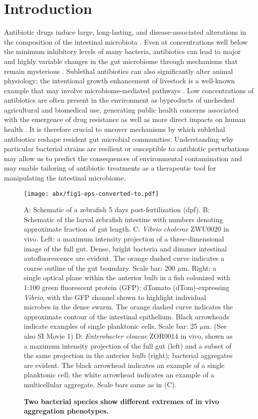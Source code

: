  \section{Introduction}


    Antibiotic drugs induce large, long-lasting, and disease-associated alterations in the composition of the intestinal microbiota \cite{dethlefsen2011incomplete,cho2012antibiotics,schulfer2019impact}. Even at concentrations well below the minimum inhibitory levels of many bacteria, antibiotics can lead to major and highly variable changes in the gut microbiome through mechanisms that remain mysterious \cite{cho2012antibiotics,schulfer2019impact,gaulke2016triclosan}. Sublethal antibiotics can also significantly alter animal physiology; the intentional growth enhancement of livestock is a well-known example that may involve microbiome-mediated pathways \cite{cho2012antibiotics}. Low concentrations of antibiotics are often present in the environment as byproducts of unchecked agricultural and biomedical use, generating public health concerns associated with the emergence of drug resistance \cite{andersson2014microbiological} as well as more direct impacts on human health \cite{national2018environmental}. It is therefore crucial to uncover mechanisms by which sublethal antibiotics reshape resident gut microbial communities. Understanding why particular bacterial strains are resilient or susceptible to antibiotic perturbations may allow us to predict the consequences of environmental contamination and may enable tailoring of antibiotic treatments as a therapeutic tool for manipulating the intestinal microbiome.  

\begin{figure}%
\centerline{
	\texttt{[image: abx/fig1-eps-converted-to.pdf]}}
	\caption{\textbf{Two bacterial species show different extremes of in vivo aggregation phenotypes.}}{  A: Schematic of a zebrafish 5 days post-fertilization (dpf). B: Schematic of the larval zebrafish intestine with numbers denoting approximate fraction of gut length. C: \textit{Vibrio cholerae} ZWU0020 in vivo. Left: a maximum intensity projection of a three-dimensional image of the full gut. Dense, bright bacteria and dimmer intestinal autofluorescence are evident. The orange dashed curve indicates a coarse outline of the gut boundary. Scale bar: 200 $\mu$m. Right: a single optical plane within the anterior bulb in a fish colonized with 1:100 green fluorescent protein (GFP): dTomato (dTom)-expressing \textit{Vibrio}, with the GFP channel shown to highlight individual microbes in the dense swarm. The orange dashed curve indicates the approximate contour of the intestinal epithelium. Black arrowheads indicate examples of single planktonic cells. Scale bar: 25 $\mu$m. (See also SI Movie 1) D: \textit{Enterobacter cloacae} ZOR0014 in vivo, shown as a maximum intensity projection of the full gut (left) and a subset of the same projection in the anterior bulb (right); bacterial aggregates are evident. The black arrowhead indicates an example of a single planktonic cell; the white arrowhead indicates an example of a multicellular aggregate. Scale bars same as in (C).}
\end{figure}


